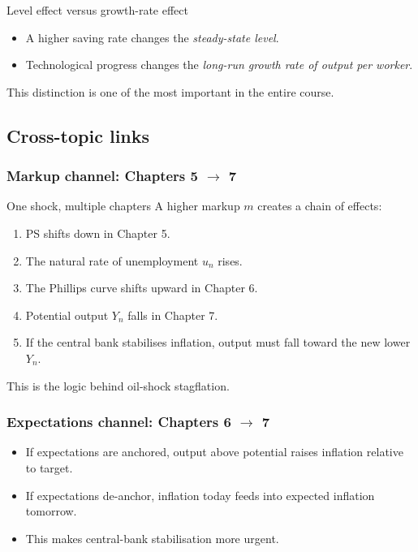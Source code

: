 \documentclass[12pt]{article}
\begin{document}
\begin{theorem}{Level effect versus growth-rate effect}{}
\begin{itemize}[leftmargin=1.5em]
    \item A higher saving rate changes the \emph{steady-state level}.
    \item Technological progress changes the \emph{long-run growth rate of output per worker}.
\end{itemize}
This distinction is one of the most important in the entire course.
\end{theorem}

\subsection{Cross-topic links}

\subsubsection*{Markup channel: Chapters 5 \texorpdfstring{$\to$}{to} 7}

\begin{theorem}{One shock, multiple chapters}{}
A higher markup $m$ creates a chain of effects:
\begin{enumerate}[leftmargin=1.5em]
    \item PS shifts down in Chapter 5.
    \item The natural rate of unemployment $u_n$ rises.
    \item The Phillips curve shifts upward in Chapter 6.
    \item Potential output $Y_n$ falls in Chapter 7.
    \item If the central bank stabilises inflation, output must fall toward the new lower $Y_n$.
\end{enumerate}
This is the logic behind oil-shock stagflation.
\end{theorem}

\subsubsection*{Expectations channel: Chapters 6 \texorpdfstring{$\to$}{to} 7}

\begin{itemize}[leftmargin=1.5em]
    \item If expectations are anchored, output above potential raises inflation relative to target.
    \item If expectations de-anchor, inflation today feeds into expected inflation tomorrow.
    \item This makes central-bank stabilisation more urgent.
\end{itemize}
\end{document}
